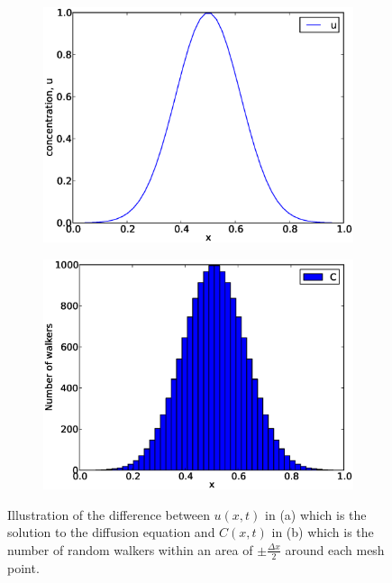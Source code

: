 \begin{figure}[H]
 \centering
 \begin{subfigure}{0.48\textwidth}
  \includegraphics[width=\textwidth]{Figures/illustration_C_pt1.eps}
  \caption{}
 \end{subfigure}
 \begin{subfigure}{0.48\textwidth}
  \includegraphics[width=\textwidth]{Figures/illustration_C_pt2.eps}
  \caption{}
 \end{subfigure}
 \caption[Illustration of $C(x)$]{Illustration of the difference between $u(x,t)$ in (a) which is the solution to the diffusion equation and $C(x,t)$ in (b) which is the number of random walkers within an area of $\pm\frac{\Delta x}{2}$ around each mesh point.}
 \label{theory:illustration_C}
\end{figure}

